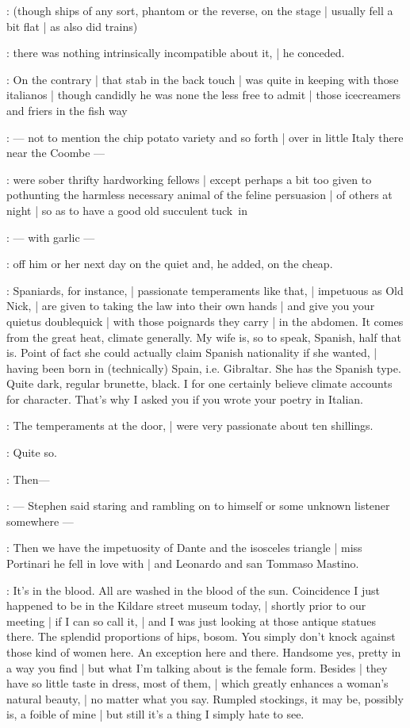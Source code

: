         :
            (though ships of any sort, phantom or the reverse, on the stage |
            usually fell a bit flat |
            as also did trains)

:
there was nothing intrinsically incompatible about it, |
he conceded.

:
On the contrary |
that stab in the back touch |
was quite in keeping with those italianos |
though candidly he was none the less free to admit |
those icecreamers and friers in the fish way

:
    --- not to mention the chip potato variety and so forth |
        over in little Italy there near the Coombe ---

:
were sober thrifty hardworking fellows |
except perhaps a bit too given
to pothunting the harmless necessary animal of the feline persuasion |
of others at night |
so as to have a good old succulent tuck~in

:
    --- with garlic  ---

:
off him or her next day on the quiet and, he added, on the cheap.

\Bloom:
Spaniards, for instance, |
passionate temperaments like that, |
impetuous as Old Nick, |
are given to taking the law into their own hands |
and give you your quietus doublequick |
with those poignards they carry |
in the abdomen.
It comes from the great heat, climate generally.
My wife is, so to speak, Spanish, half that is.
Point of fact she could actually claim Spanish nationality if she wanted, |
having been born in (technically) Spain, i.e. Gibraltar.
She has the Spanish type.
Quite dark, regular brunette, black.
I for one certainly believe climate accounts for character.
That's why I asked you if you wrote your poetry in Italian.

\Stephen:
The temperaments at the door, |
were very passionate about ten shillings.

\Bloom:
Quite so.

\Stephen:
Then---

:
    --- Stephen said staring and rambling on
        to himself or some unknown listener somewhere ---

\Stephen:
Then we have the impetuosity of Dante and the isosceles triangle |
miss Portinari he fell in love with |
and Leonardo and san Tommaso Mastino.

\Bloom:
It's in the blood.
All are washed in the blood of the sun.
Coincidence I just happened to be
in the Kildare street museum today, |
shortly prior to our meeting |
if I can so call it, |
and I was just looking at those antique statues there.
The splendid proportions of hips, bosom.
You simply don't knock against those kind of women here.
An exception here and there.
Handsome yes, pretty in a way you find |
but what I'm talking about is the female form.
Besides |
they have so little taste in dress, most of them, |
which greatly enhances a woman's natural beauty, |
no matter what you say.
Rumpled stockings, it may be, possibly is, a foible of mine |
but still it's a thing I simply hate to see.

